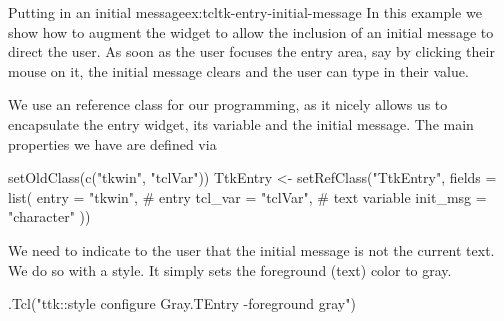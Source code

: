 

\begin{example}{Putting in an initial message}{ex:tcltk-entry-initial-message}
In this example we show how to augment the  widget
to allow the inclusion of an initial message to direct the user. As
soon as the user focuses the entry area, say by clicking their mouse
on it, the initial message clears and the user can type in their
value.

We use an \R{} reference class for our programming, as it nicely
allows us to encapsulate the entry widget, its \TCL{} variable and the
initial message. The main properties we have are defined via


\begin{Schunk}
\begin{Sinput}
 setOldClass(c("tkwin", "tclVar"))
 TtkEntry <- setRefClass("TtkEntry",
                         fields = list(
                           entry = "tkwin",    # entry
                           tcl_var  = "tclVar",   # text variable
                           init_msg = "character"
                           ))
\end{Sinput}
\end{Schunk}
%

We need to indicate to the user that the initial message is not the
current text. We do so with a style. It simply sets the foreground
(text) color to gray.

\begin{Schunk}
\begin{Sinput}
 .Tcl("ttk::style configure Gray.TEntry -foreground gray") 
\end{Sinput}
\end{Schunk}


\end{example}
